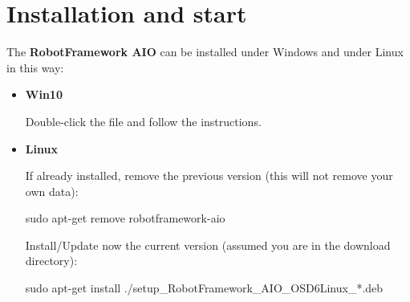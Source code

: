 %
%
%

\chapter{Installation and start}

The \textbf{RobotFramework AIO} can be installed under Windows and under Linux in this way:

\begin{itemize}
   \item \textbf{Win10}

         Double-click the  file and follow the instructions.

   \item \textbf{Linux}

         If already installed, remove the previous version (this will not remove your own data):

         \begin{pythonlog}
sudo apt-get remove robotframework-aio
\end{pythonlog}

         Install/Update now the current version (assumed you are in the download directory):
         \begin{pythonlog}
sudo apt-get install ./setup_RobotFramework_AIO_OSD6Linux\_*.deb
\end{pythonlog}

\end{itemize}

